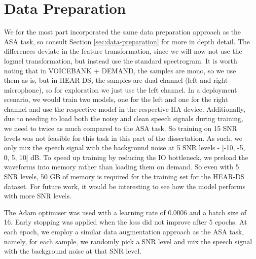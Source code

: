 \documentclass[logo,bsc,singlespacing,parskip,online]{infthesis}
\begin{document}
\section{Data Preparation}
We for the most part incorporated the same data preparation approach as the ASA task, so consult Section \ref{sec:data-preparation} for 
more in depth detail. The differences deviate in the feature transformation, 
since we will now not use the logmel transformation, but instead use the standard 
spectrogram. It is worth noting that in VOICEBANK + DEMAND, the samples 
are mono, so we use them as is, but in HEAR-DS, the samples are dual-channel (left and right microphone), 
so for exploration we just use the left channel. In a deployment scenario, we would train two models, one for the left 
and one for the right channel and use the respective model in the respective HA device.
Additionally, due to needing to load both the noisy and clean speech signals 
during training, we need to twice as much compared to the ASA task.
So training on 15 SNR levels was not feasible for this task 
in this part of the dissertation. As such, we only 
mix the speech signal with the background noise at 5 SNR levels - [-10, -5, 0, 5, 10] dB.
To speed up training by reducing the IO bottleneck, we preload the waveforms into memory 
rather than loading them on demand. So even with 5 SNR levels, 
50 GB of memory is required for the training set for the HEAR-DS dataset.
For future work, it would be interesting to see how the model performs with 
more SNR levels.

The Adam optimiser was used with a learning rate of 0.0006 and a batch size of 16.
Early stopping was applied when the loss did not improve after 5 epochs.
At each epoch, we employ a similar data augmentation approach as the ASA task, 
namely, for each sample, we randomly pick a SNR level and mix the speech signal with the background noise 
at that SNR level. 
\end{document}

